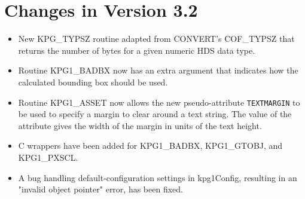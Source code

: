 \documentclass[11pt]{starlink}
\begin{document}
\section{Changes in Version 3.2}
\begin{itemize}
\item New KPG\_TYPSZ routine adapted from CONVERT's COF\_TYPSZ that
      returns the number of bytes for a given numeric HDS data type.
\item Routine KPG1\_BADBX now has an extra argument that indicates how the
      calculated bounding box should be used.
\item Routine KPG1\_ASSET now allows the new pseudo-attribute \texttt{TEXTMARGIN}
      to be used to specify a margin to clear around a text string. The
      value of the attribute gives the width of the margin in units of the
      text height.
\item C wrappers have been added for KPG1\_BADBX, KPG1\_GTOBJ, and KPG1\_PXSCL.
\item A bug handling default-configuration settings in kpg1Config, resulting in
      an "invalid object pointer" error, has been fixed.

\end{itemize}
\end{document}
